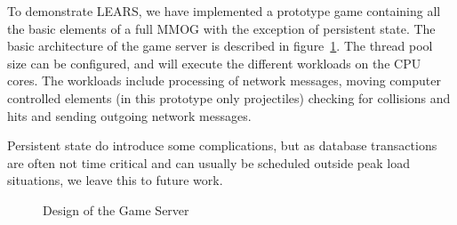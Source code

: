 To demonstrate LEARS, we have implemented a prototype
game containing all the basic elements of a full MMOG with the
exception of persistent state. The basic architecture of the
game server is described in figure~\ref{fig:server}. The thread 
pool size can be configured, and will execute the different workloads 
on the CPU cores. The workloads include processing of network messages, moving computer controlled elements (in this prototype only projectiles) checking for collisions and hits and sending outgoing network messages.
%

Persistent state do introduce some complications, but as database
transactions are often not time critical and can usually be scheduled
outside peak load situations, we leave this to future work.

\begin{figure}
\centering
\vspace{-3mm}
\caption{Design of the Game Server}
\vspace{-3mm}
\label{fig:server}
\end{figure}

